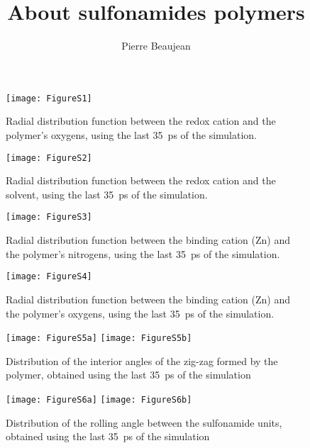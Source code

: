 \documentclass[12pt,a4paper]{article}
\title{About sulfonamides polymers}
\author{Pierre Beaujean}
\begin{document}
	
	\maketitle
	
\begin{figure}[!h]
	\centering
	\texttt{[image: FigureS1]}
	\caption{Radial distribution function between the redox cation and the polymer's oxygens, using the last \SI{35}{\pico\second} of the simulation.}
\end{figure}

\begin{figure}[!h]
	\centering
	\texttt{[image: FigureS2]}
	\caption{Radial distribution function between the redox cation and the solvent, using the last \SI{35}{\pico\second} of the simulation.}
\end{figure}

\begin{figure}[!h]
	\centering
\texttt{[image: FigureS3]}
\caption{Radial distribution function between the binding cation (Zn) and the polymer's nitrogens, using the last \SI{35}{\pico\second} of the simulation.}
\end{figure}

\begin{figure}[!h]
\centering
\texttt{[image: FigureS4]}
\caption{Radial distribution function between the binding cation (Zn) and the polymer's oxygens, using the last \SI{35}{\pico\second} of the simulation.}
\end{figure}

\begin{figure}[!h]
\centering
\texttt{[image: FigureS5a]}
\texttt{[image: FigureS5b]}
\caption{Distribution of the interior angles of the zig-zag formed by the polymer,  obtained using the last \SI{35}{\pico\second} of the simulation}
\end{figure}

\begin{figure}[!h]
\centering
\texttt{[image: FigureS6a]}
\texttt{[image: FigureS6b]}
\caption{Distribution of the rolling angle between the sulfonamide units,  obtained using the last \SI{35}{\pico\second} of the simulation}
\end{figure}
	
\end{document}
